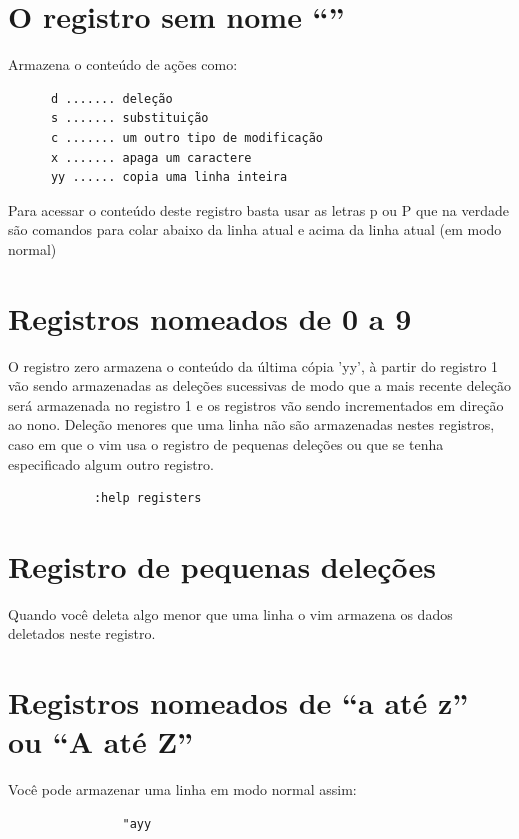 \documentclass[10pt,a4paper,openany]{book}
\begin{document}
\section{O registro sem nome ``''}
\label{O registro sem nome ``''}

Armazena o conteúdo de ações como:

\begin{verbatim}
	  d ....... deleção
	  s ....... substituição
	  c ....... um outro tipo de modificação
	  x ....... apaga um caractere
	  yy ...... copia uma linha inteira
\end{verbatim}

Para acessar o conteúdo deste registro basta usar as letras p ou P que
na verdade são comandos para colar abaixo da linha atual e acima da
linha atual (em modo normal)

\section{Registros nomeados de 0 a 9}
\label{Registros nomeados de 0 a 9}

O registro zero armazena o conteúdo da última cópia 'yy', à partir do
registro 1 vão sendo armazenadas as deleções sucessivas de modo que a
mais recente deleção será armazenada no registro 1 e os registros vão
sendo incrementados em direção ao nono.  Deleção menores que uma linha
não são armazenadas nestes registros, caso em que o vim usa o registro
de pequenas deleções ou que se tenha especificado algum outro
registro.

\begin{verbatim}
			:help registers
\end{verbatim}

\section{Registro de pequenas deleções}
\label{Registro de pequenas deleções}
Quando você deleta algo menor que uma linha o vim armazena os dados deletados neste registro.

\section{Registros nomeados de ``a até z'' ou ``A até Z''}
\label{Registros nomeados de ``a até z'' ou ``A até Z''}
Você pode armazenar uma linha em modo normal assim:

\begin{verbatim}
				"ayy
\end{verbatim}
\end{document}
